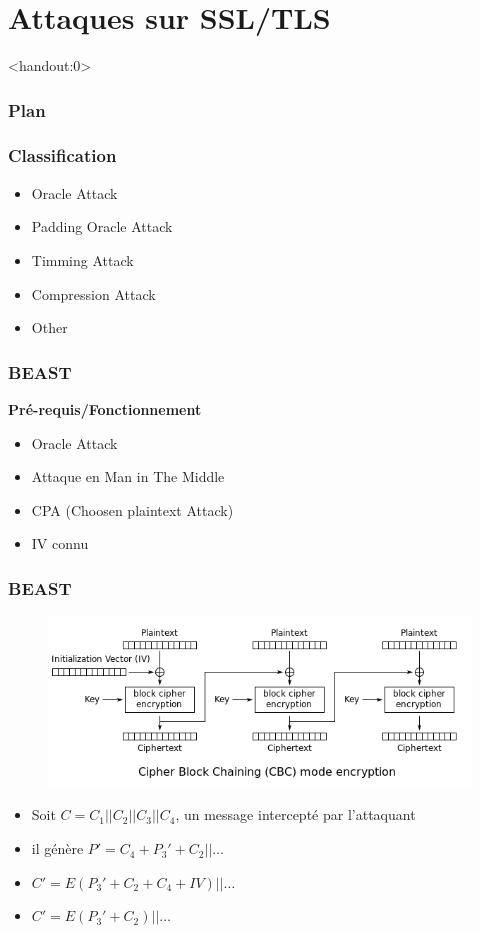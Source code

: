 \section{Attaques sur SSL/TLS}

\begin{frame}<handout:0>
  \frametitle{Plan}
  \tableofcontents[currentsection]
\end{frame}

\begin{frame}
  \frametitle{Classification }

  \begin{itemize}
  \item Oracle Attack
    \pause
  \item Padding Oracle Attack
    \pause
  \item Timming Attack
    \pause
  \item Compression Attack
    \pause
  \item Other
    \pause
  \end{itemize}
\end{frame}

\begin{frame}
  \frametitle{BEAST}
  \textbf{Pré-requis/Fonctionnement}
  \begin{itemize}
  \item Oracle Attack
  \item Attaque en Man in The Middle
  \item CPA (Choosen plaintext Attack) 
  \item IV connu
  \end{itemize}
\end{frame}

\begin{frame}
  \frametitle{BEAST}
  \begin{figure}[h]
    \centering
  \includegraphics[scale=0.3]{CBC_Encrypt}
  \end{figure}  
\begin{itemize}
  \item  Soit $C = C_1 || C_2 || C_3 || C_4$, un message intercepté par l'attaquant
    \pause
  \item il génère $P' = C_4 + P_3' + C_2 || \dots$
    \pause
  \item  $C' = E(P_3' + C_2 + C_4 + IV) || \dots $
    \pause
  \item $ C' = E(P_3' + C_2) || \dots $
  \end{itemize}
\end{frame}

